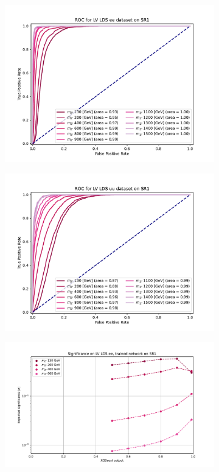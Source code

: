 \documentclass[12pt, a4paper]{book}
\begin{document}
\begin{figure}[!ht]
   \begin{subfigure}[b]{0.49\textwidth}
      \centering
      \includegraphics[width=1\textwidth]{XGBoost/Model_independent/50-100/LV_LDS/ROC_ee.pdf}
   \end{subfigure}
   \hfill
   \begin{subfigure}[b]{0.49\textwidth}
      \centering
      \includegraphics[width=1\textwidth]{XGBoost/Model_independent/50-100/LV_LDS/ROC_uu.pdf}
   \end{subfigure}
   \hfill
	\begin{subfigure}[b]{0.49\textwidth}
      \centering
      \includegraphics[width=1\textwidth]{XGBoost/Model_independent/50-100/LV_LDS/EXP_SIG_ee.pdf}

\end{subfigure}
\end{figure}
\end{document}
